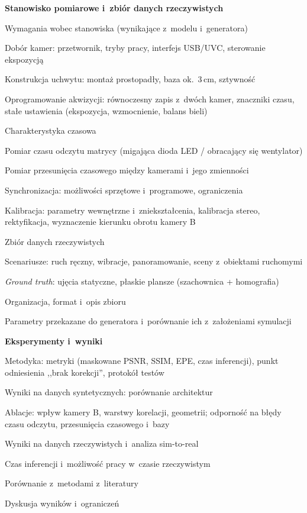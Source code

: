 \begin{toc}
\item \textbf{Stanowisko pomiarowe i~zbiór danych rzeczywistych} \HW
  \begin{toc}
    \item Wymagania wobec stanowiska (wynikające z~modelu i~generatora)
    \item Dobór kamer: przetwornik, tryby pracy, interfejs USB/UVC, sterowanie ekspozycją
    \item Konstrukcja uchwytu: montaż prostopadły, baza ok.\ 3\,cm, sztywność
    \item Oprogramowanie akwizycji: równoczesny zapis z~dwóch kamer, znaczniki czasu, stałe
          ustawienia (ekspozycja, wzmocnienie, balans bieli)
    \item Charakterystyka czasowa
      \begin{toc}
        \item Pomiar czasu odczytu matrycy (migająca dioda LED / obracający się wentylator)
        \item Pomiar przesunięcia czasowego między kamerami i~jego zmienności
        \item Synchronizacja: możliwości sprzętowe i~programowe, ograniczenia
      \end{toc}
    \item Kalibracja: parametry wewnętrzne i~zniekształcenia, kalibracja
          stereo, rektyfikacja, wyznaczenie kierunku obrotu kamery B
    \item Zbiór danych rzeczywistych
      \begin{toc}
        \item Scenariusze: ruch ręczny, wibracje, panoramowanie, sceny z~obiektami ruchomymi
        \item \emph{Ground truth}: ujęcia statyczne, płaskie plansze (szachownica + homografia)
        \item Organizacja, format i~opis zbioru
      \end{toc}
    \item Parametry przekazane do generatora i~porównanie ich z~założeniami symulacji
  \end{toc}

\item \textbf{Eksperymenty i~wyniki} \WS
  \begin{toc}
    \item Metodyka: metryki (maskowane PSNR, SSIM, EPE, czas inferencji), punkt
          odniesienia ,,brak korekcji'', protokół testów
    \item Wyniki na danych syntetycznych: porównanie architektur \IK
    \item Ablacje: wpływ kamery B, warstwy korelacji, geometrii; odporność na błędy czasu
          odczytu, przesunięcia czasowego i~bazy \IK
    \item Wyniki na danych rzeczywistych i~analiza sim-to-real \WS
    \item Czas inferencji i~możliwość pracy w~czasie rzeczywistym \WS
    \item Porównanie z~metodami z~literatury \WS
    \item Dyskusja wyników i~ograniczeń
  \end{toc}


\end{toc}
